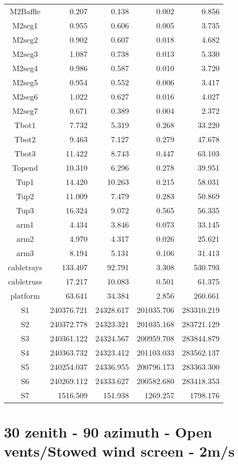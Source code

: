 \begin{longtable}{crrrr}
 M2Baffle & 0.207 & 0.138 & 0.002 & 0.856 \\
 M2seg1 & 0.955 & 0.606 & 0.005 & 3.735 \\
 M2seg2 & 0.902 & 0.607 & 0.018 & 4.682 \\
 M2seg3 & 1.087 & 0.738 & 0.013 & 5.330 \\
 M2seg4 & 0.986 & 0.587 & 0.010 & 3.720 \\
 M2seg5 & 0.954 & 0.552 & 0.006 & 3.417 \\
 M2seg6 & 1.022 & 0.627 & 0.016 & 4.027 \\
 M2seg7 & 0.671 & 0.389 & 0.004 & 2.372 \\
 Tbot1 & 7.732 & 5.319 & 0.268 & 33.220 \\
 Tbot2 & 9.463 & 7.127 & 0.279 & 47.678 \\
 Tbot3 & 11.422 & 8.743 & 0.447 & 63.103 \\
 Topend & 10.310 & 6.296 & 0.278 & 39.951 \\
 Tup1 & 14.420 & 10.263 & 0.215 & 58.031 \\
 Tup2 & 11.009 & 7.479 & 0.283 & 50.869 \\
 Tup3 & 16.324 & 9.072 & 0.565 & 56.335 \\
 arm1 & 4.434 & 3.846 & 0.073 & 33.145 \\
 arm2 & 4.970 & 4.317 & 0.026 & 25.621 \\
 arm3 & 8.194 & 5.131 & 0.106 & 31.413 \\
 cabletrays & 133.407 & 92.791 & 3.308 & 530.793 \\
 cabletruss & 17.217 & 10.083 & 0.501 & 61.375 \\
 platform & 63.641 & 34.384 & 2.856 & 260.661 \\
 S1 & 240376.721 & 24328.617 & 201035.706 & 283310.219 \\
 S2 & 240372.778 & 24323.321 & 201035.168 & 283721.129 \\
 S3 & 240361.122 & 24324.567 & 200959.708 & 283844.879 \\
 S4 & 240363.732 & 24323.412 & 201103.033 & 283562.137 \\
 S5 & 240254.037 & 24336.955 & 200796.173 & 283363.300 \\
 S6 & 240269.112 & 24333.627 & 200582.680 & 283418.353 \\
 S7 & 1516.509 & 151.938 & 1269.257 & 1798.176 \\
\bottomrule
\end{longtable}




\section{30 zenith - 90 azimuth - Open vents/Stowed wind screen - 2m/s}
\label{zen30az090_OS2}

